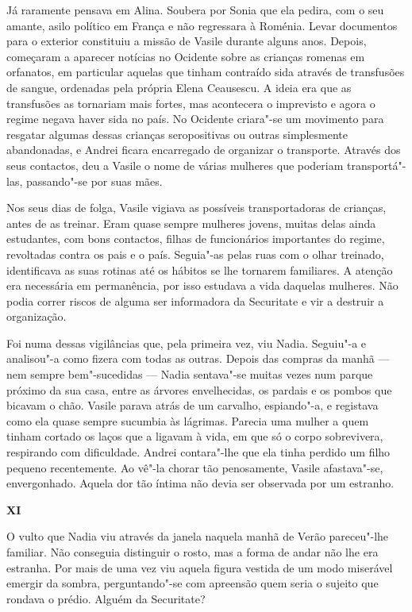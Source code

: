 Já raramente pensava em Alina. Soubera por Sonia que ela pedira, com o
seu amante, asilo político em França e não regressara à Roménia. Levar
documentos para o exterior constituiu a missão de Vasile durante alguns
anos. Depois, começaram a aparecer notícias no Ocidente sobre as
crianças romenas em orfanatos, em particular aquelas
que tinham contraído sida através de transfusões de sangue, ordenadas
pela própria Elena Ceausescu. A ideia era que as transfusões as
tornariam mais fortes, mas acontecera o imprevisto e agora o regime
negava haver sida no país. No Ocidente criara"-se um movimento para
resgatar algumas dessas crianças seropositivas ou outras simplesmente
abandonadas, e Andrei ficara encarregado de organizar o transporte.
Através dos seus contactos, deu a Vasile o nome de várias mulheres que
poderiam transportá"-las, passando"-se por suas mães.

Nos seus dias de folga, Vasile vigiava as possíveis transportadoras de
crianças, antes de as treinar. Eram quase sempre mulheres jovens, muitas
delas ainda estudantes, com bons contactos, filhas de funcionários importantes do regime, revoltadas contra os pais e o país. Seguia"-as pelas
ruas com o olhar treinado, identificava as suas rotinas até os hábitos
se lhe tornarem familiares. A atenção era necessária em permanência, por
isso estudava a vida daquelas mulheres. Não podia correr riscos de
alguma ser informadora da Securitate e vir a destruir a organização.

Foi numa dessas vigilâncias que, pela primeira vez, viu Nadia. Seguiu"-a
e analisou"-a como fizera com todas as outras. Depois das compras da
manhã --- nem sempre bem"-sucedidas --- Nadia sentava"-se muitas vezes num parque próximo da sua
casa, entre as árvores envelhecidas, os pardais e os pombos que bicavam
o chão. Vasile parava atrás de um carvalho, espiando"-a, e registava como
ela quase sempre sucumbia às lágrimas. Parecia uma mulher a quem tinham
cortado os laços que a ligavam à vida,
em que só o corpo sobrevivera, respirando com dificuldade. Andrei
contara"-lhe que ela tinha perdido um filho pequeno recentemente. Ao
vê"-la chorar tão penosamente, Vasile afastava"-se, envergonhado. Aquela
dor tão íntima não devia ser observada por um estranho.


\pagebreak
\vspace*{1.8cm}
\noindent{}\textbf{XI}

\bigskip

O vulto que Nadia viu através da janela naquela manhã de Verão
pareceu"-lhe familiar. Não conseguia distinguir o rosto, mas a forma de
andar não lhe era estranha. Por mais de uma vez viu aquela figura
vestida de um modo miserável emergir da sombra, perguntando"-se com
apreensão quem seria o sujeito que rondava o prédio. Alguém da
Securitate?

